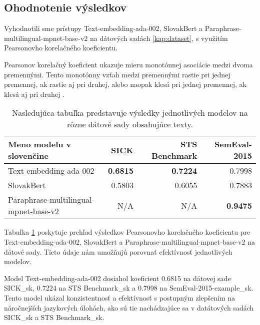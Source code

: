 \subsection{Ohodnotenie výsledkov}
Vyhodnotili sme prístupy Text-embedding-ada-002, SlovakBert a Paraphrase-multilingual-mpnet-base-v2 na dátových sadách \ref{kap:dataset}, s využitím Pearsonovho korelačného koeficientu. 
\vspace{1em}

\noindent
Pearsonov korelačný koeficient ukazuje mieru monotónnej asociácie medzi dvoma premennými. Tento monotónny vzťah medzi premennými rastie pri jednej premennej, ak rastie aj pri druhej, alebo naopak klesá pri jednej premennej, ak klesá aj pri druhej \cite{correlation}.  

\label{kap:tabulka}
\begin{table}[h]
\caption[Sémantická podobnosť dátových sád]{Nasledujúca tabuľka predstavuje výsledky jednotlivých modelov na rôzne dátové sady obsahujúce texty.}
\label{tab:t}
\begin{center}
\begin{tabular}{lrrr}
\hline 
Meno modelu v slovenčine & SICK & STS Benchmark & SemEval-2015\\
\hline
Text-embedding-ada-002 & \textbf{0.6815} & \textbf{0.7224} & 0.7998 \\
SlovakBert  & 0.5803 & 0.6055 & 0.7883\\
Paraphrase-multilingual-mpnet-base-v2 & N/A & N/A  & \textbf{0.9475}\\
\hline
\end{tabular}
\end{center}
\end{table}

\noindent
Tabuľka \ref{tab:t} poskytuje prehľad výsledkov Pearsonovho korelačného koeficientu pre Text-embedding-ada-002, SlovakBert a Paraphrase-multilingual-mpnet-base-v2 na dátové sady. Tieto údaje nám umožňujú porovnať efektívnosť jednotlivých modelov. 
\vspace{1em}

\noindent
Model Text-embedding-ada-002 dosiahol koeficient 0.6815 na dátovej sade SICK\_sk, 0.7224 na STS Benchmark\_sk a 0.7998 na SemEval-2015-example\_sk. Tento model ukázal konzistentnosť a efektívnosť s postupným zlepšením na náročnejších jazykových úlohách, ako sú tie nachádzajúce sa v datátových sadách SICK\_sk a STS Benchmark\_sk.
\vspace{1em}

